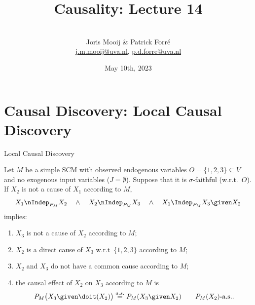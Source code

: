 \title[Causality]{Causality: Lecture 14}
\author[Joris Mooij]{\\[5mm]\large Joris Mooij \& Patrick Forr\'e\\
\url{j.m.mooij@uva.nl}, \url{p.d.forre@uva.nl}}
\date[2022-05-10]{\normalsize May 10th, 2023}
\maketitle

\part{Causal Discovery: Local Causal Discovery}
\frame{\partpage}

\begin{frame}{Local Causal Discovery \cite{Cooper1997}}
\begin{Prp}[\ref{prp:LCD}]
  Let $M$ be a simple SCM with observed endogenous variables $O = \{1,2,3\} \subseteq V$ and no exogenous input variables ($J=\emptyset$).
  Suppose that it is $\sigma$-faithful (w.r.t.\ $O$). 
  If $X_2$ is not a cause of $X_1$ according to $M$, 
  $$X_1 \nIndep_{P_M} X_2 \quad \land \quad X_2 \nIndep_{P_M} X_3 \quad \land \quad X_1 \Indep_{P_M} X_3 \given X_2$$
  implies:
  \begin{enumerate}
  \item $X_3$ is not a cause of $X_2$ according to $M$;
  \item $X_2$ is a direct cause of $X_3$ w.r.t\ $\{1,2,3\}$ according to $M$;
  \item $X_2$ and $X_3$ do not have a common cause according to $M$;
  \item the causal effect of $X_2$ on $X_3$ according to $M$ is 
    \begin{equation}\label{sl-eq:LCD}
      P_{M}\big(X_3 \given \doit(X_2)\big) \stackrel{a.s.}{=} P_{M}(X_3 \given X_2) \qquad P_{M}(X_2)\text{-a.s.}.
    \end{equation}
  \end{enumerate}
\end{Prp}
\end{frame}

